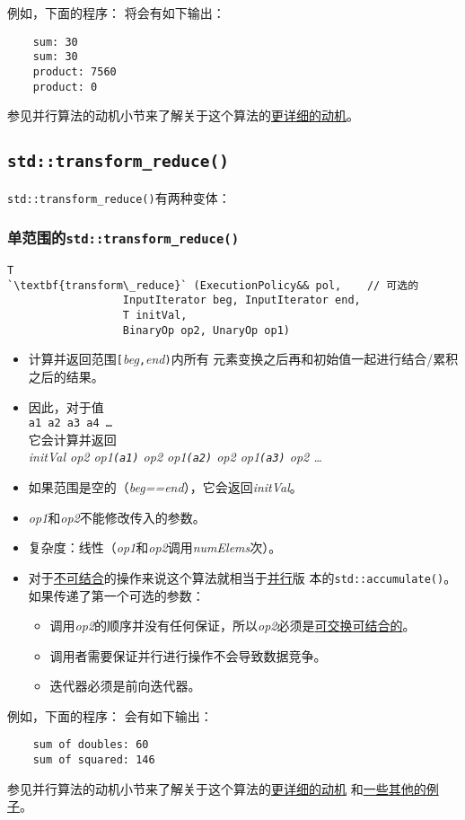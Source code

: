 例如，下面的程序：
将会有如下输出：
\begin{lstlisting}
    sum: 30
    sum: 30
    product: 7560
    product: 0
\end{lstlisting}
参见并行算法的动机小节来了解关于这个算法的\hyperref[ch22.6.1]{更详细的动机}。

\subsection{\texttt{std::transform\_reduce()}}\label{ch23.2.2}
\texttt{std::transform\_reduce()}有两种变体：

\subsubsection{单范围的\texttt{std::transform\_reduce()}}
\begin{lstlisting}[frame=single,xleftmargin=13pt,xrightmargin=13pt]
T
`\textbf{transform\_reduce}` (ExecutionPolicy&& pol,    // 可选的
                  InputIterator beg, InputIterator end,
                  T initVal,
                  BinaryOp op2, UnaryOp op1)
\end{lstlisting}
\begin{itemize}
    \item 计算并返回范围\texttt{[}\emph{beg}\texttt{,}\emph{end}\texttt{)}内所有
    元素变换之后再和初始值一起进行结合/累积之后的结果。
    \item 因此，对于值\\
    \hspace*{2em}\texttt{a1 a2 a3 a4 \ldots}\\
    它会计算并返回\\
    \hspace*{2em}\emph{initVal op2 op1\texttt{(a1)} op2 op1\texttt{(a2)} op2 op1\texttt{(a3)} op2 \ldots}
    \item 如果范围是空的（\emph{beg==end}），它会返回\emph{initVal}。
    \item \emph{op1}和\emph{op2}不能修改传入的参数。
    \item 复杂度：线性（\emph{op1}和\emph{op2}调用\emph{numElems}次）。
    \item 对于\hyperref[ch22.6.1.3]{不可结合}的操作来说这个算法就相当于\hyperref[ch22]{并行}版
    本的\texttt{std::accumulate()}。如果传递了第一个可选的参数：
    \begin{itemize}
        \item 调用\emph{op2}的顺序并没有任何保证，所以\emph{op2}必须是\hyperref[ch22.6.1.1]{可交换可结合的}。
        \item 调用者需要保证并行进行操作不会导致数据竞争。
        \item 迭代器必须是前向迭代器。
    \end{itemize}
\end{itemize}
例如，下面的程序：
会有如下输出：
\begin{lstlisting}
    sum of doubles: 60
    sum of squared: 146
\end{lstlisting}
参见并行算法的动机小节来了解关于这个算法的\hyperref[transform动机]{更详细的动机}
和\hyperref[ch22.6.1.4]{一些其他的例子}。

